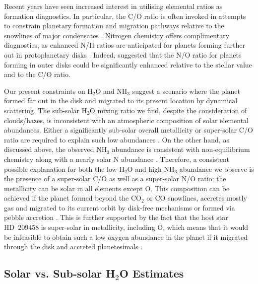 \documentclass[fleqn,usenatbib]{mnras}
\begin{document}
Recent years have seen increased interest in utilising elemental ratios as formation diagnostics. In particular, the C/O ratio is often invoked in attempts to constrain planetary formation and migration pathways relative to the snowlines of major condensates \citep[e.g.][]{Oberg2011,Madhusudhan2014b}. Nitrogen chemistry offers complimentary diagnostics, as enhanced N/H ratios are anticipated for planets forming further out in protoplanetary disks \citep{Piso2016}. Indeed, \citet{Piso2016} suggested that the N/O ratio for planets forming in outer disks could be significantly enhanced relative to the stellar value and to the C/O ratio.

Our present constraints on H$_2$O and NH$_3$ suggest a scenario where the planet formed far out in the disk and migrated to its present location by dynamical scattering. The sub-solar H$_2$O mixing ratio we find, despite the consideration of clouds/hazes, is inconsistent with an atmospheric composition of solar elemental abundances. Either a significantly sub-solar overall metallicity or super-solar C/O ratio are required to explain such low abundances \citep{Madhusudhan2014a}. On the other hand, as discussed above, the observed NH$_3$ abundance is consistent with non-equilibrium chemistry along with a nearly solar N abundance \citep{Moses2011}. Therefore, a consistent possible explanation for both the low H$_2$O and high NH$_3$ abundance we observe is the presence of a super-solar C/O as well as a super-solar N/O ratio; the metallicity can be solar in all elements except O. This composition can be achieved if the planet formed beyond the CO$_2$ or CO snowlines, accretes mostly gas  \citep{Oberg2011,Madhusudhan2014b,Piso2016} and migrated to its current orbit by disk-free mechanisms \citep{Madhusudhan2014b} or formed via pebble accretion \citep{Madhusudhan2016c}. This is further supported by the fact that the host star HD~209458 is super-solar in metallicity, including O, which means that it would be infeasible to obtain such a low oxygen abundance in the planet if it migrated through the disk and accreted planetesimals \citep[e.g.][]{Brewer2016,Mordasini2016}.

\subsection{Solar vs. Sub-solar H$_2$O Estimates}
\end{document}
